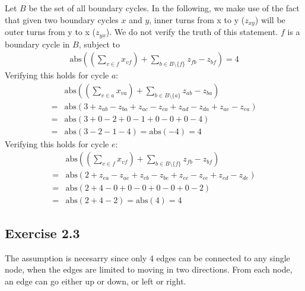 Let $B$ be the set of all boundary cycles. In the following, we make use
of the fact that given two boundary cycles $x$ and $y$, inner turns from x to y ($z_{xy}$)
will be outer turns from y to x ($z_{yx}$). We do not verify the truth of this
statement. $f$ is a boundary cycle in $B$, subject to
\begin{align*}
  \text{abs}\left(\left( \sum_{v\in f} x_{vf} \right) + \sum_{b\in B \setminus \{f\}} z_{fb} - z_{bf}\right) = 4
\end{align*}
Verifying this holds for cycle $a$:
\begin{align*}
  & \text{abs}\left(\left( \sum_{v\in a} x_{va} \right) + \sum_{b\in B \setminus \{a\}} z_{ab} - z_{ba}\right) \\
  =& \text{abs}\left(3 + z_{ab} - z_{ba} + z_{ac} - z_{ca} + z_{ad} - z_{da} + z_{ae} - z_{ea}\right) \\
  =& \text{abs}\left(3 + 0 - 2 + 0 - 1 + 0 - 0 + 0 - 4\right) \\
  =& \text{abs}\left(3 - 2 - 1 - 4\right) = \text{abs}(-4) = 4
\end{align*}
Verifying this holds for cycle $e$:
\begin{align*}
  &   \text{abs}\left(\left( \sum_{v\in f} x_{vf}\right) + \sum_{b\in B \setminus \{f\}} z_{fb} - z_{bf}\right) \\
  =&  \text{abs}\left(2 + z_{ea} - z_{ae} + z_{eb} - z_{be} + z_{ec} - z_{ce} + z_{ed} - z_{de}\right) \\
  =&  \text{abs}\left(2 + 4 - 0 + 0 - 0 + 0 - 0 + 0 - 2\right) \\
  =&  \text{abs}\left(2 + 4 - 2\right) = \text{abs}(4) = 4
\end{align*}
\subsection{Exercise 2.3}

The assumption is necesarry since only 4 edges can be connected to any single
node, when the edges are limited to moving in two directions. From each node, an
edge can go either up or down, or left or right.


